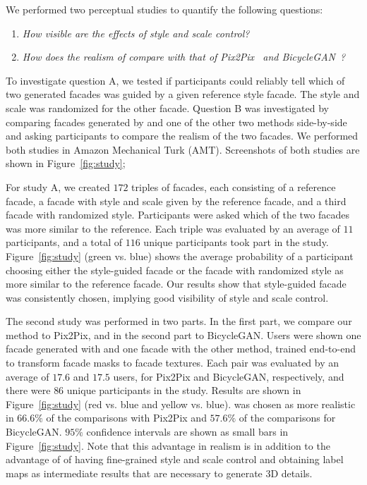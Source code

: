 We performed two perceptual studies to quantify the following questions:
\begin{enumerate}[label=(\Alph*)]
\item \emph{How visible are the effects of style and scale control?}
\item \emph{How does the realism of \systemName compare with that of Pix2Pix~\cite{pix2pix} and BicycleGAN~\cite{zhu2017multimodal}?}
\end{enumerate}
To investigate question A, we tested if participants could reliably tell which of two generated facades was guided by a given reference style facade. The style and scale was randomized for the other facade.
%
Question B was investigated by comparing facades generated by \systemName and one of the other two methods side-by-side and asking participants to compare the realism of the two facades.
%
We performed both studies in Amazon Mechanical Turk (AMT). Screenshots of both studies are shown in Figure~\ref{fig:study}; 

For study A, we created $172$ triples of facades, each consisting of a reference facade, a facade with style and scale given by the reference facade, and a third facade with randomized style. Participants were asked which of the two facades was more similar to the reference. Each triple was evaluated by an average of $11$ participants, and a total of $116$ unique participants took part in the study. Figure~\ref{fig:study} (green vs. blue) shows the average probability of a participant choosing either the style-guided facade or the facade with randomized style as more similar to the reference facade. Our results show that style-guided facade was consistently chosen, implying good visibility of style and scale control.

The second study was performed in two parts. In the first part, we compare our method to Pix2Pix, and in the second part to BicycleGAN. Users were shown one facade generated with \systemName and one facade with the other method, trained end-to-end to transform facade masks to facade textures. Each pair was evaluated by an average of $17.6$ and $17.5$ users, for Pix2Pix and BicycleGAN, respectively, and there were $86$ unique participants in the study. Results are shown in Figure~\ref{fig:study} (red vs. blue and yellow vs. blue). \systemName was chosen as more realistic in $66.6\%$ of the comparisons with Pix2Pix and $57.6\%$ of the comparisons for BicycleGAN. $95\%$ confidence intervals are shown as small bars in Figure~\ref{fig:study}. Note that this advantage in realism is in addition to the advantage of of having fine-grained style and scale control and obtaining label maps as intermediate results that are necessary to generate 3D details.

